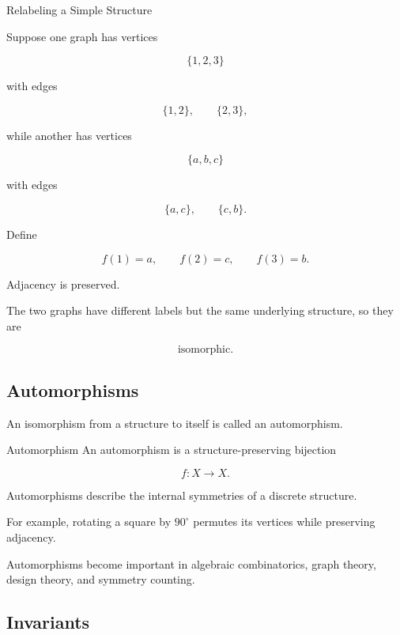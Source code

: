\begin{workedexamplebox}{Relabeling a Simple Structure}

Suppose one graph has vertices

\[
\{1,2,3\}
\]

with edges

\[
\{1,2\},
\qquad
\{2,3\},
\]

while another has vertices

\[
\{a,b,c\}
\]

with edges

\[
\{a,c\},
\qquad
\{c,b\}.
\]

Define

\[
f(1)=a,
\qquad
f(2)=c,
\qquad
f(3)=b.
\]

Adjacency is preserved.

\begin{answerbox}
The two graphs have different labels but the same underlying structure,
so they are

\[
\boxed{\text{isomorphic}.}
\]
\end{answerbox}

\end{workedexamplebox}

\subsection{Automorphisms}
\label{subsec:automorphisms-discrete}

An isomorphism from a structure to itself is called an automorphism.

\begin{definitionbox}{Automorphism}
An automorphism is a structure-preserving bijection

\[
\boxed{
f:X\to X.
}
\]
\end{definitionbox}

Automorphisms describe the internal symmetries of a discrete structure.

For example, rotating a square by \(90^\circ\) permutes its vertices
while preserving adjacency.

Automorphisms become important in algebraic combinatorics, graph
theory, design theory, and symmetry counting.

\subsection{Invariants}
\label{subsec:discrete-invariants}

